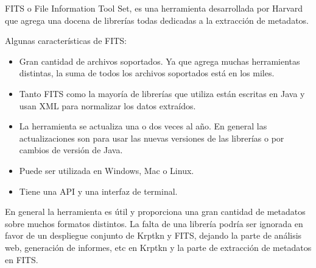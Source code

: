 FITS o File Information Tool Set, es una herramienta desarrollada por Harvard que agrega una docena de librerías todas dedicadas a la extracción de metadatos.

Algunas características de FITS:

\begin{itemize}
  \item Gran cantidad de archivos soportados. Ya que agrega muchas herramientas distintas, la suma de todos los archivos soportados está en los miles.
  \item Tanto FITS como la mayoría de librerías que utiliza están escritas en Java y usan XML para normalizar los datos extraídos.
  \item La herramienta se actualiza una o dos veces al año. En general las actualizaciones son para usar las nuevas versiones de las librerías o por cambios de versión de Java.
  \item Puede ser utilizada en Windows, Mac o Linux.
  \item Tiene una API y una interfaz de terminal.
\end{itemize}

En general la herramienta es útil y proporciona una gran cantidad de metadatos sobre muchos formatos distintos. La falta de una librería podría ser ignorada en favor de un despliegue conjunto de Krptkn y FITS, dejando la parte de análisis web, generación de informes, etc en Krptkn y la parte de extracción de metadatos en FITS.